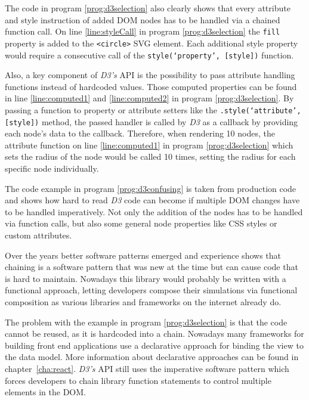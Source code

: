 The code in program \ref{prog:d3selection} also clearly shows that every attribute and style instruction of added DOM nodes has to be handled via a chained function call. On line \ref{line:styleCall} in program \ref{prog:d3selection} the \texttt{fill} property is added to the \texttt{<circle>} SVG element. Each additional style property would require a consecutive call of the \texttt{style(`property', [style])} function.

Also, a key component of \emph{D3's} API is the possibility to pass attribute handling functions instead of hardcoded values. Those computed properties can be found in line \ref{line:computed1} and \ref{line:computed2} in program \ref{prog:d3selection}. By passing a function to property or attribute setters like the \texttt{.style(`attribute', [style])} method, the passed handler is called by \emph{D3} as a callback by providing each node's data to the callback. Therefore, when rendering 10 nodes, the attribute function on line \ref{line:computed1} in program \ref{prog:d3selection} which sets the radius of the node would be called 10 times, setting the radius for each specific node individually.

The code example in program \ref{prog:d3confusing} is taken from production code and shows how hard to read \emph{D3} code can become if multiple DOM changes have to be handled imperatively. Not only the addition of the nodes has to be handled via function calls, but also some general node properties like CSS styles or custom attributes.

Over the years better software patterns emerged and experience shows that chaining is a software pattern that was new at the time but can cause code that is hard to maintain. Nowadays this library would probably be written with a functional approach, letting developers compose their simulations via functional composition as various libraries and frameworks on the internet already do. 

The problem with the example in program \ref{prog:d3selection} is that the code cannot be reused, as it is hardcoded into a chain. Nowadays many frameworks for building front end applications use a declarative approach for binding the view to the data model. More information about declarative approaches can be found in chapter~\ref{cha:react}. \emph{D3's} API still uses the imperative software pattern which forces developers to chain library function statements to control multiple elements in the DOM.


